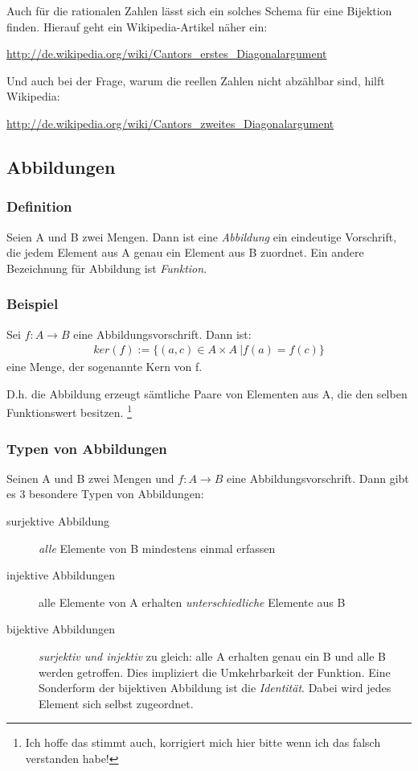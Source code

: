 \documentclass[a4paper,12pt, DIV12]{scrartcl}
\begin{document}
Auch für die rationalen Zahlen lässt sich ein solches Schema für eine Bijektion finden.
Hierauf geht ein Wikipedia-Artikel näher ein:

\url{http://de.wikipedia.org/wiki/Cantors_erstes_Diagonalargument}

Und auch bei der Frage, warum die reellen Zahlen nicht abzählbar sind, hilft Wikipedia:

\url{http://de.wikipedia.org/wiki/Cantors_zweites_Diagonalargument}

\subsection{Abbildungen}

\subsubsection{Definition}
Seien A und B zwei Mengen.
Dann ist eine \emph{Abbildung} ein eindeutige Vorschrift, die jedem Element aus A genau ein Element aus B zuordnet.
Ein andere Bezeichnung für Abbildung ist \emph{Funktion}.
\subsubsection{Beispiel}
Sei $f:{A}\longrightarrow{B}$ eine Abbildungsvorschrift.
Dann ist:
\begin{align*}
   ker(f) := \{(a,c) \in A \times A\ | f(a)=f(c)\}
\end{align*}
eine Menge, der sogenannte Kern von f.

D.h. die Abbildung erzeugt sämtliche Paare von Elementen aus A, die den selben Funktionswert besitzen.
\footnote{Ich hoffe das stimmt auch, korrigiert mich hier bitte wenn
  ich das falsch verstanden habe!}
\newpage
\subsubsection{Typen von Abbildungen}
Seinen A und B zwei Mengen und $f:{A}\longrightarrow{B}$ eine Abbildungsvorschrift.
Dann gibt es 3 besondere Typen von Abbildungen:

\begin{description}
\item[surjektive Abbildung] \emph{alle} Elemente von B mindestens einmal erfassen
\item[injektive Abbildungen] alle Elemente von A erhalten \emph{unterschiedliche} Elemente aus B
\item[bijektive Abbildungen] \emph{surjektiv und injektiv} zu gleich: alle A erhalten genau ein B und alle B werden getroffen.
Dies impliziert die Umkehrbarkeit der Funktion. Eine Sonderform der bijektiven Abbildung ist die \emph{Identität}. Dabei wird jedes Element sich selbst zugeordnet.
\end{description}
\end{document}
